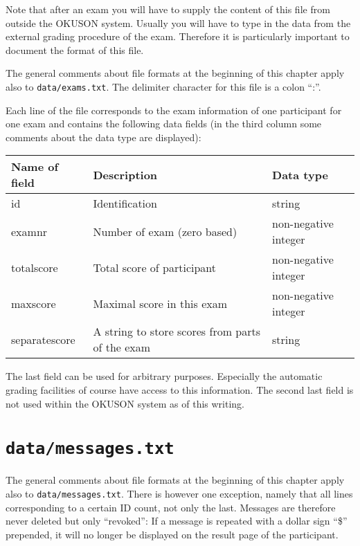 \documentclass[12pt,openany,a4paper]{book}
\newcommand{\OKUSON}{\textsf{OKUSON}}
\begin{document}
Note that after an exam you will have to supply the content of this
file from outside the {\OKUSON} system. Usually you will have to type in
the data from the external grading procedure of the exam. Therefore it
is particularly important to document the format of this file.

The general comments about file formats at the beginning of this chapter
apply also to \texttt{data/exams.txt}. The delimiter character for this
file is a colon ``:''. 

Each line of the file corresponds to the exam information of one
participant for one exam and contains the following data fields (in the
third column some comments about the data type are displayed):

\begin{center}
\begin{tabular}{|l|l|l|}
\hline
Name of field & Description & Data type \\
\hline
\hline
id & Identification & string \\
\hline
examnr & Number of exam (zero based) & non-negative integer \\
\hline
totalscore & Total score of participant & non-negative integer \\
\hline
maxscore & Maximal score in this exam & non-negative integer \\
\hline
separatescore & A string to store scores from parts of the exam & string \\
\hline
\end{tabular}
\end{center}

The last field can be used for arbitrary purposes. Especially the automatic
grading facilities of course have access to this information. The second
last field is not used within the {\OKUSON} system as of this writing.

\section{\texttt{data/messages.txt}}
\label{sec:messages.txt}

The general comments about file formats at the beginning of this chapter
apply also to \texttt{data/messages.txt}. There is however one exception,
namely that all lines corresponding to a certain ID count, not only the
last. Messages are therefore never deleted but only ``revoked'': If
a message is repeated with a dollar sign ``\$'' prepended, it will no
longer be displayed on the result page of the participant. 
\end{document}
